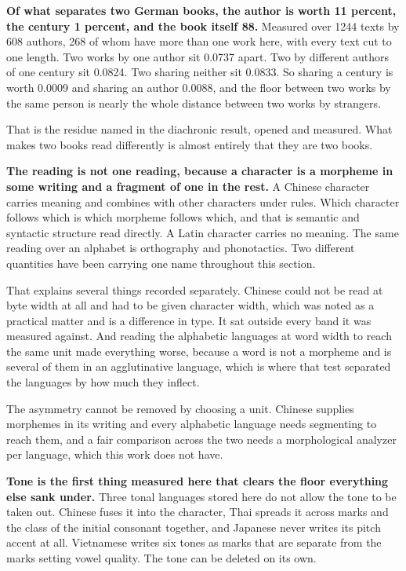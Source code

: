 \textbf{Of what separates two German books, the author is worth 11 percent, the century 1 percent, and the book itself 88.} Measured over 1244 texts by 608 authors, 268 of whom have more than one work here, with every text cut to one length. Two works by one author sit 0.0737 apart. Two by different authors of one century sit 0.0824. Two sharing neither sit 0.0833. So sharing a century is worth 0.0009 and sharing an author 0.0088, and the floor between two works by the same person is nearly the whole distance between two works by strangers.

That is the residue named in the diachronic result, opened and measured. What makes two books read differently is almost entirely that they are two books.

\textbf{The reading is not one reading, because a character is a morpheme in some writing and a fragment of one in the rest.} A Chinese character carries meaning and combines with other characters under rules. Which character follows which is which morpheme follows which, and that is semantic and syntactic structure read directly. A Latin character carries no meaning. The same reading over an alphabet is orthography and phonotactics. Two different quantities have been carrying one name throughout this section.

That explains several things recorded separately. Chinese could not be read at byte width at all and had to be given character width, which was noted as a practical matter and is a difference in type. It sat outside every band it was measured against. And reading the alphabetic languages at word width to reach the same unit made everything worse, because a word is not a morpheme and is several of them in an agglutinative language, which is where that test separated the languages by how much they inflect.

The asymmetry cannot be removed by choosing a unit. Chinese supplies morphemes in its writing and every alphabetic language needs segmenting to reach them, and a fair comparison across the two needs a morphological analyzer per language, which this work does not have.

\textbf{Tone is the first thing measured here that clears the floor everything else sank under.} Three tonal languages stored here do not allow the tone to be taken out. Chinese fuses it into the character, Thai spreads it across marks and the class of the initial consonant together, and Japanese never writes its pitch accent at all. Vietnamese writes six tones as marks that are separate from the marks setting vowel quality. The tone can be deleted on its own.

